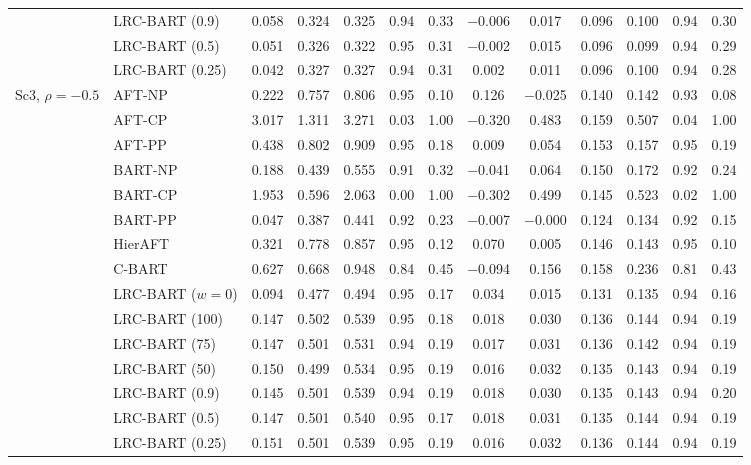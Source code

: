 \documentclass[11pt]{article}
\theoremstyle{definition}
\theoremstyle{plain}
\begin{document}
\begin{center}
\begin{longtable}{llccccccccccc}
& LRC-BART (0.9) & 0.058 & 0.324 & 0.325 & 0.94 & 0.33 & $-$0.006 & 0.017 & 0.096 & 0.100 & 0.94 & 0.30 \\
& LRC-BART (0.5) & 0.051 & 0.326 & 0.322 & 0.95 & 0.31 & $-$0.002 & 0.015 & 0.096 & 0.099 & 0.94 & 0.29 \\
& LRC-BART (0.25) & 0.042 & 0.327 & 0.327 & 0.94 & 0.31 & 0.002 & 0.011 & 0.096 & 0.100 & 0.94 & 0.28 \\
\midrule
\multirow{15}{*}{Sc3, $\rho=-0.5$} & AFT-NP & 0.222 & 0.757 & 0.806 & 0.95 & 0.10 & 0.126 & $-$0.025 & 0.140 & 0.142 & 0.93 & 0.08 \\
& AFT-CP & 3.017 & 1.311 & 3.271 & 0.03 & 1.00 & $-$0.320 & 0.483 & 0.159 & 0.507 & 0.04 & 1.00 \\
& AFT-PP & 0.438 & 0.802 & 0.909 & 0.95 & 0.18 & 0.009 & 0.054 & 0.153 & 0.157 & 0.95 & 0.19 \\
& BART-NP & 0.188 & 0.439 & 0.555 & 0.91 & 0.32 & $-$0.041 & 0.064 & 0.150 & 0.172 & 0.92 & 0.24 \\
& BART-CP & 1.953 & 0.596 & 2.063 & 0.00 & 1.00 & $-$0.302 & 0.499 & 0.145 & 0.523 & 0.02 & 1.00 \\
& BART-PP & 0.047 & 0.387 & 0.441 & 0.92 & 0.23 & $-$0.007 & $-$0.000 & 0.124 & 0.134 & 0.92 & 0.15 \\
& HierAFT & 0.321 & 0.778 & 0.857 & 0.95 & 0.12 & 0.070 & 0.005 & 0.146 & 0.143 & 0.95 & 0.10 \\
& C-BART & 0.627 & 0.668 & 0.948 & 0.84 & 0.45 & $-$0.094 & 0.156 & 0.158 & 0.236 & 0.81 & 0.43 \\
& LRC-BART ($w=0$) & 0.094 & 0.477 & 0.494 & 0.95 & 0.17 & 0.034 & 0.015 & 0.131 & 0.135 & 0.94 & 0.16 \\
& LRC-BART (100) & 0.147 & 0.502 & 0.539 & 0.95 & 0.18 & 0.018 & 0.030 & 0.136 & 0.144 & 0.94 & 0.19 \\
& LRC-BART (75) & 0.147 & 0.501 & 0.531 & 0.94 & 0.19 & 0.017 & 0.031 & 0.136 & 0.142 & 0.94 & 0.19 \\
& LRC-BART (50) & 0.150 & 0.499 & 0.534 & 0.95 & 0.19 & 0.016 & 0.032 & 0.135 & 0.143 & 0.94 & 0.19 \\
& LRC-BART (0.9) & 0.145 & 0.501 & 0.539 & 0.94 & 0.19 & 0.018 & 0.030 & 0.135 & 0.143 & 0.94 & 0.20 \\
& LRC-BART (0.5) & 0.147 & 0.501 & 0.540 & 0.95 & 0.17 & 0.018 & 0.031 & 0.135 & 0.144 & 0.94 & 0.19 \\
& LRC-BART (0.25) & 0.151 & 0.501 & 0.539 & 0.95 & 0.19 & 0.016 & 0.032 & 0.136 & 0.144 & 0.94 & 0.19 \\

\end{longtable}
\end{center}
\end{document}
